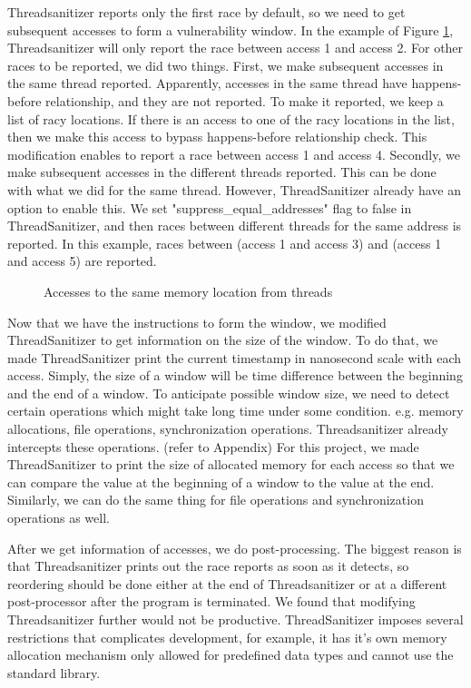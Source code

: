 \documentclass{acm_proc_article-sp}
\begin{document}
Threadsanitizer reports only the first race by default, so we need to get subsequent accesses to form a vulnerability window. In the example of Figure \ref{fig:threadAccesses}, Threadsanitizer will only report the race between access 1 and access 2. For other races to be reported, we did two things. First, we make subsequent accesses in the same thread reported. Apparently, accesses in the same thread have happens-before relationship, and they are not reported. To make it reported, we keep a list of racy locations. If there is an access to one of the racy locations in the list, then we make this access to bypass happens-before relationship check. This modification enables to report a race between access 1 and access 4. Secondly, we make subsequent accesses in the different threads reported. This can be done with what we did for the same thread. However, ThreadSanitizer already have an option to enable this. We set  "suppress\_equal\_addresses" flag to false in ThreadSanitizer, and then races between different threads for the same address is reported. In this example, races between (access 1 and access 3) and (access 1 and access 5) are reported.

\begin{figure}
\centering
{}
\caption{Accesses to the same memory location from threads}
\label{fig:threadAccesses}
\end{figure}


Now that we have the instructions to form the window, we modified ThreadSanitizer to get information on the size of the window. To do that, we made ThreadSanitizer print the current timestamp in nanosecond scale with each access. Simply, the size of a window will be time difference between the beginning and the end of a window. To anticipate possible window size, we need to detect certain operations which might take long time under some condition. e.g. memory allocations, file operations, synchronization operations. Threadsanitizer already intercepts these operations. (refer to Appendix) For this project, we made ThreadSanitizer to print the size of allocated memory for each access so that we can compare the value at the beginning of a window to the value at the end. Similarly, we can do the same thing for file operations and synchronization operations as well.

After we get information of accesses, we do post-processing. The biggest reason is that Threadsanitizer prints out the race reports as soon as it detects, so reordering should be done either at the end of Threadsanitizer or at a different post-processor after the program is terminated. We found that modifying Threadsanitizer further would not be productive. ThreadSanitizer imposes several restrictions that complicates development, for example, it has it's own memory allocation mechanism only allowed for predefined data types and cannot use the standard library. 
\end{document}
